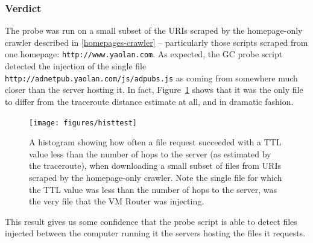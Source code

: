 \subsubsection{Verdict}
The probe was run on a small subset of the URIs scraped by the homepage-only crawler described in \autoref{homepages-crawler} -- particularly those scripts scraped from one homepage: \texttt{http://www.yaolan.com}.
As expected, the GC probe script detected the injection of the single file \texttt{http://adnetpub.yaolan.com/js/adpubs.js} as coming from somewhere much closer than the server hosting it.
In fact, Figure~\ref{fig_histtest} shows that it was the only file to differ from the traceroute distance estimate at all, and in dramatic fashion.
\begin{figure}
	\texttt{[image: figures/histtest]}
	\caption{
		A histogram showing how often a file request succeeded with a TTL value less than the number of hops to the server (as estimated by the traceroute), when downloading a small subset of files from URIs scraped by the homepage-only crawler.
		Note the single file for which the TTL value was less than the number of hops to the server, was the very file that the VM Router was injecting.
	}
	\label{fig_histtest}
\end{figure}
This result gives us some confidence that the probe script is able to detect files injected between the computer running it the servers hosting the files it requests.
